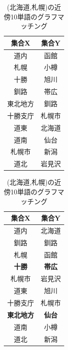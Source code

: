 \begin{table}[h]
  \begin{minipage}[t]{.45\textwidth}
    \caption[(北海道,札幌)の近傍10単語]{(北海道,札幌)の近傍10単語}
    \label{}
    \begin{center}
      \begin{tabular}{|c||c|} \hline
        集合X & 集合Y \\ \hline \hline
        道内 & 函館 \\
        札幌 & 小樽 \\
        十勝 & 旭川 \\
        釧路 & 帯広 \\
        東北地方 & 釧路 \\
        十勝支庁 & 札幌市 \\
        道東 & 北海道 \\
        道南 & 仙台 \\
        札幌市 & 新潟 \\
        道北 & 岩見沢 \\ \hline
      \end{tabular}
    \end{center}
  \end{minipage}
  \hfill
  \begin{minipage}[t]{.45\textwidth}
    \caption[(北海道,札幌)の近傍10単語のグラフマッチング]{(北海道,札幌)の近傍10単語のグラフマッチング}
    \label{}
    \begin{center}
      \begin{tabular}{|c||c|} \hline
        集合X & 集合Y \\ \hline \hline
        道内 & 北海道 \\
        釧路 & 釧路 \\
        札幌 & 函館 \\
        \textbf{十勝} & \textbf{帯広} \\
        札幌市 & 岩見沢 \\
        道東 & 旭川 \\
        十勝支庁 & 札幌市 \\
        \textbf{東北地方} & \textbf{仙台} \\
        道南 & 小樽 \\
        道北 & 新潟 \\ \hline
      \end{tabular}
    \end{center}
  \end{minipage}
\end{table}

